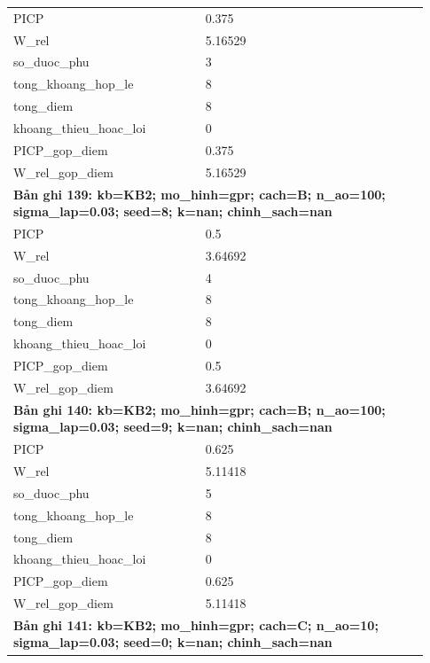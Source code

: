 \begin{longtable}{p{0.43\linewidth}p{0.50\linewidth}}
PICP & 0.375 \\
W\_\allowbreak rel & 5.16529 \\
so\_\allowbreak duoc\_\allowbreak phu & 3 \\
tong\_\allowbreak khoang\_\allowbreak hop\_\allowbreak le & 8 \\
tong\_\allowbreak diem & 8 \\
khoang\_\allowbreak thieu\_\allowbreak hoac\_\allowbreak loi & 0 \\
PICP\_\allowbreak gop\_\allowbreak diem & 0.375 \\
W\_\allowbreak rel\_\allowbreak gop\_\allowbreak diem & 5.16529 \\
\midrule
\multicolumn{2}{p{0.95\linewidth}}{\textbf{Bản ghi 139: kb=KB2; mo\_hinh=gpr; cach=B; n\_ao=100; sigma\_lap=0.03; seed=8; k=nan; chinh\_sach=nan}} \\
PICP & 0.5 \\
W\_\allowbreak rel & 3.64692 \\
so\_\allowbreak duoc\_\allowbreak phu & 4 \\
tong\_\allowbreak khoang\_\allowbreak hop\_\allowbreak le & 8 \\
tong\_\allowbreak diem & 8 \\
khoang\_\allowbreak thieu\_\allowbreak hoac\_\allowbreak loi & 0 \\
PICP\_\allowbreak gop\_\allowbreak diem & 0.5 \\
W\_\allowbreak rel\_\allowbreak gop\_\allowbreak diem & 3.64692 \\
\midrule
\multicolumn{2}{p{0.95\linewidth}}{\textbf{Bản ghi 140: kb=KB2; mo\_hinh=gpr; cach=B; n\_ao=100; sigma\_lap=0.03; seed=9; k=nan; chinh\_sach=nan}} \\
PICP & 0.625 \\
W\_\allowbreak rel & 5.11418 \\
so\_\allowbreak duoc\_\allowbreak phu & 5 \\
tong\_\allowbreak khoang\_\allowbreak hop\_\allowbreak le & 8 \\
tong\_\allowbreak diem & 8 \\
khoang\_\allowbreak thieu\_\allowbreak hoac\_\allowbreak loi & 0 \\
PICP\_\allowbreak gop\_\allowbreak diem & 0.625 \\
W\_\allowbreak rel\_\allowbreak gop\_\allowbreak diem & 5.11418 \\
\midrule
\multicolumn{2}{p{0.95\linewidth}}{\textbf{Bản ghi 141: kb=KB2; mo\_hinh=gpr; cach=C; n\_ao=10; sigma\_lap=0.03; seed=0; k=nan; chinh\_sach=nan}} \\

\end{longtable}
